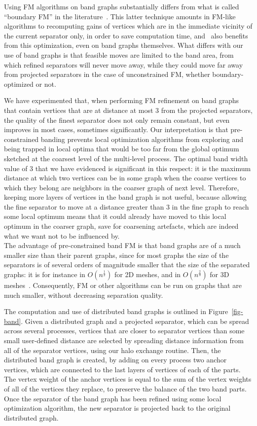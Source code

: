\documentclass[fleqn,12pt,twoside]{article}
\begin{document}
Using FM algorithms on band graphs substantially differs from what is
called ``boundary FM'' in the literature~\cite{hele93c,kaku98b}. This
latter technique amounts in FM-like algorithms to recomputing gains of
vertices which are in the immediate vicinity of the current separator
only, in order to save computation time, and \scotch\ also benefits
from this optimization, even on band graphs themselves. What differs
with our use of band graphs is that feasible moves are limited to the
band area, from which refined separators will never move away, while
they could move far away from projected separators in the case of
unconstrained FM, whether boundary-optimized or not.

We have experimented that, when performing FM refinement on band
graphs that contain vertices that are at distance at most $3$ from the
projected separators, the quality of the finest separator does not
only remain constant, but even improves in most cases, sometimes
significantly. Our interpretation is that pre-constrained banding
prevents local optimization algorithms from exploring and being
trapped in local optima that would be too far from the global optimum
sketched at the coarsest level of the multi-level process. The
optimal band width value of $3$ that we have evidenced is significant
in this respect: it is the maximum distance at which two vertices can
be in some graph when the coarse vertices to which they belong are
neighbors in the coarser graph of next level. Therefore, keeping more
layers of vertices in the band graph is not useful, because allowing
the fine separator to move at a distance greater than $3$ in the fine
graph to reach some local optimum means that it could already have moved
to this local optimum in the coarser graph, save for coarsening
artefacts, which are indeed what we want not to be influenced by.
\\

The advantage of pre-constrained band FM is that band graphs are of a
much smaller size than their parent graphs, since for most graphs the
size of the separators is of several orders of magnitude smaller that
the size of the separated graphs: it is for instance in
$O(n^\frac{1}{2})$ for 2D meshes, and in $O(n^\frac{2}{3})$ for 3D
meshes~\cite{lirota79}. Consequently, FM or other algorithms can be
run on graphs that are much smaller, without decreasing separation
quality.

The computation and use of distributed band graphs is outlined in
Figure~\ref{fig-band}. Given a distributed graph and a projected
separator, which can be spread across several processes, vertices
that are closer to separator vertices than some small user-defined
distance are selected by spreading distance information from all of
the separator vertices, using our halo exchange routine. Then, the
distributed band graph is created, by adding on every process two
anchor vertices, which are connected to the last layers of vertices of
each of the parts. The vertex weight of the anchor vertices is equal
to the sum of the vertex weights of all of the vertices they replace,
to preserve the balance of the two band parts. Once the separator of
the band graph has been refined using some local optimization
algorithm, the new separator is projected back to the original
distributed graph.
\end{document}
